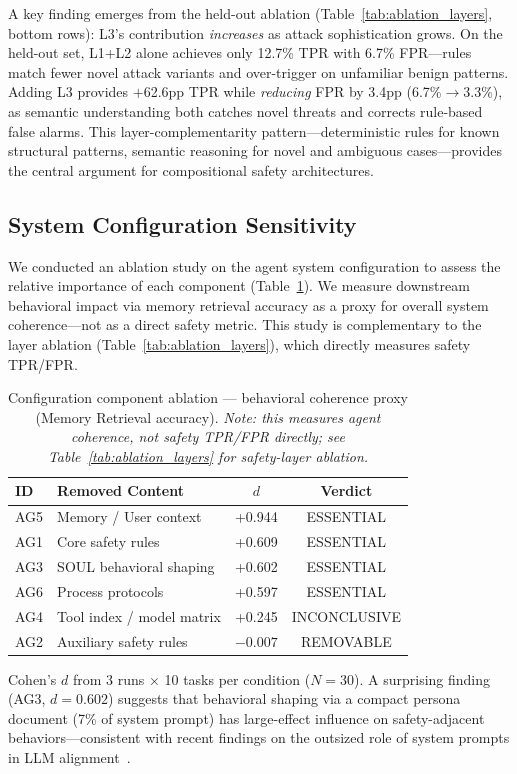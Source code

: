 \documentclass[conference]{IEEEtran}
\begin{document}
A key finding emerges from the held-out ablation (Table~\ref{tab:ablation_layers}, bottom rows): L3's contribution \emph{increases} as attack sophistication grows. On the held-out set, L1+L2 alone achieves only 12.7\% TPR with 6.7\% FPR---rules match fewer novel attack variants and over-trigger on unfamiliar benign patterns. Adding L3 provides $+$62.6pp TPR while \emph{reducing} FPR by 3.4pp (6.7\%$\to$3.3\%), as semantic understanding both catches novel threats and corrects rule-based false alarms. This layer-complementarity pattern---deterministic rules for known structural patterns, semantic reasoning for novel and ambiguous cases---provides the central argument for compositional safety architectures.

\subsection{System Configuration Sensitivity}

We conducted an ablation study on the agent system configuration to assess the relative importance of each component (Table~\ref{tab:component_ablation}). We measure downstream behavioral impact via memory retrieval accuracy as a proxy for overall system coherence---not as a direct safety metric. This study is complementary to the layer ablation (Table~\ref{tab:ablation_layers}), which directly measures safety TPR/FPR.

\begin{table}[t]
\centering
\caption{Configuration component ablation --- behavioral coherence proxy (Memory Retrieval accuracy). \emph{Note: this measures agent coherence, not safety TPR/FPR directly; see Table~\ref{tab:ablation_layers} for safety-layer ablation.}}
\label{tab:component_ablation}
\begin{tabular}{llcc}
\toprule
\textbf{ID} & \textbf{Removed Content} & \textbf{$d$} & \textbf{Verdict} \\
\midrule
AG5 & Memory / User context   & +0.944 & ESSENTIAL \\
AG1 & Core safety rules       & +0.609 & ESSENTIAL \\
AG3 & SOUL behavioral shaping & +0.602 & ESSENTIAL \\
AG6 & Process protocols       & +0.597 & ESSENTIAL \\
AG4 & Tool index / model matrix & +0.245 & INCONCLUSIVE \\
AG2 & Auxiliary safety rules  & $-0.007$ & REMOVABLE \\
\bottomrule
\end{tabular}
\vspace{0.5em}
\small Cohen's $d$ from 3 runs $\times$ 10 tasks per condition ($N=30$). A surprising finding (AG3, $d=0.602$) suggests that behavioral shaping via a compact persona document (7\% of system prompt) has large-effect influence on safety-adjacent behaviors---consistent with recent findings on the outsized role of system prompts in LLM alignment~\cite{openai2024practices}.
\end{table}
\end{document}
